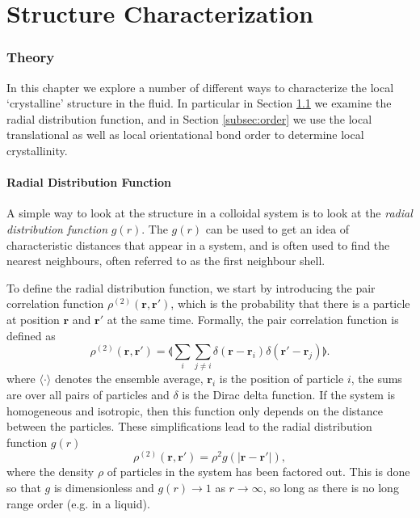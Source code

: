 \documentclass[thesis]{subfiles}
\begin{document}
\newpage

\part{Structure Characterization}
\section{Theory}

In this chapter we explore a number of different ways to characterize the local `crystalline' structure in the fluid. In particular in Section \ref{subsec:rdf} we examine the radial distribution function, and in Section \ref{subsec:order} we use the local translational as well as local orientational bond order to determine local crystallinity.

\subsection{Radial Distribution Function} \label{subsec:rdf}

A simple way to look at the structure in a colloidal system is to look at the \emph{radial distribution function} $g(r)$.  The $g(r)$ can be used to get an idea of characteristic distances that appear in a system, and is often used to find the nearest neighbours, often referred to as the first neighbour shell. 

To define the radial distribution function, we start by introducing the pair correlation function 
$\rho^{(2)}(\bm r, \bm r')$,  which is the probability that there is a particle at position $\bm r$ and $\bm r'$ at the same time. Formally, the pair correlation function is defined as \cite{dijkstra2018modsim}
\begin{equation}
\rho^{(2)}(\bm r, \bm r') = \llangle \sum_i \sum_{j \neq i} \delta(\bm r - \bm r_i) \delta(\bm r' - \bm r_j) \rrangle.
\end{equation}
where $\langle \cdot \rangle$ denotes the ensemble average, $\bm r_i$ is the position of particle $i$, the sums are over all pairs of particles and $\delta$ is the Dirac delta function.
If the system is homogeneous and isotropic, then this function only depends on the distance between the particles. These simplifications lead to the radial distribution function $g(r)$ \cite{dijkstra2018modsim}
\begin{equation}
\rho^{(2)}(\bm r, \bm r') = \rho^2 g(|\bm r - \bm r'|), \label{eq:gofr}
\end{equation}
where the density $\rho$ of particles in the system has been factored out. This is done so that $g$ is dimensionless and $g(r) \rightarrow 1$ as $r \rightarrow \infty$, so long as there is no long range order (e.g. in a liquid).
\end{document}
